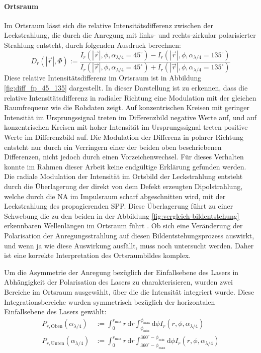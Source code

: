 \documentclass[titlepage,  ngerman]{article}
\begin{document}
		\paragraph{Ortsraum}
		Im Ortsraum lässt sich die relative Intensitätsdifferenz zwischen der Leckstrahlung, die durch die Anregung mit links- und rechts-zirkular polarisierter Strahlung entsteht, durch folgenden Ausdruck berechnen:
		\begin{equation}
		 	\label{eq:diff_measure}
			D_r\left(|\vec{r}|, \Phi\right) := \dfrac{I_r(|\vec{r}|, \phi, \alpha_{\lambda /4} = 45^\circ) - I_r(|\vec{r}|, \phi, \alpha_{\lambda /4} = 135^\circ)}{I_r(|\vec{r}|, \phi, \alpha_{\lambda /4} = 45^\circ) + I_r(|\vec{r}|, \phi, \alpha_{\lambda /4} = 135^\circ)}
		\end{equation} 
		 Diese relative Intensitätsdifferenz im Ortsraum ist in Abbildung \ref{fig:diff_fp_45_135} dargestellt. In dieser Darstellung ist zu erkennen, dass die relative Intensitätsdifferenz in radialer Richtung eine Modulation mit der gleichen Raumfrequenz wie die Rohdaten zeigt. Auf konzentrischen Kreisen mit geringer Intensität im Ursprungssignal treten im Differenzbild negative Werte auf, und auf konzentrischen Kreisen mit hoher Intensität im Ursprungssignal treten positive Werte im Differenzbild auf. Die Modulation der Differenz in polarer Richtung entsteht nur durch ein Verringern einer der beiden oben beschriebenen Differenzen, nicht jedoch durch einen Vorzeichenwechsel. Für dieses Verhalten konnte im Rahmen dieser Arbeit keine endgültige Erklärung gefunden werden. Die radiale Modulation der Intensität im Ortsbild der Leckstrahlung entsteht durch die Überlagerung der direkt von dem Defekt erzeugten Dipolstrahlung, welche durch die NA im Impulsraum scharf abgeschnitten wird, mit der Leckstrahlung des propagierenden SPP. Diese Überlagerung führt zu einer Schwebung die zu den beiden in der Abbildung \ref{fig:vergleich-bildentstehung} erkennbaren Wellenlängen im Ortsraum führt \cite{Hohenau.2011}. Ob sich eine Veränderung der Polarisation der Anregungsstrahlung auf diesen Bildentstehungsprozess auswirkt, und wenn ja wie diese Auswirkung ausfällt, muss noch untersucht werden. Daher ist eine korrekte Interpretation des Ortsraumbildes komplex. 
		 
		 Um die Asymmetrie der Anregung bezüglich der Einfallsebene des Lasers in Abhängigkeit der Polarisation des Lasers zu charakterisieren, wurden zwei Bereiche im Ortsraum ausgewählt, über die die Intensität integriert wurde. Diese Integrationsbereiche wurden symmetrisch bezüglich der horizontalen Einfallsebene des Lasers gewählt:		 
		 \begin{align}
		 	P_{r, \mathrm{Oben}}(\alpha_{\lambda/4}) &:= \int_{0}^{r_\mathrm{max}}r \, \mathrm{d}r \int_{\phi_\mathrm{min}}^{\phi_\mathrm{max}} \mathrm{d}\phi I_r(r, \phi, \alpha_{\lambda /4}) \\
		 	\nonumber
		 	P_{r, \mathrm{Unten}}(\alpha_{\lambda/4}) &:= \int_{0}^{r_\mathrm{max}}r \, \mathrm{d}r \int_{360^\circ -\phi_\mathrm{max}}^{360^\circ - \phi_\mathrm{min}} \mathrm{d}\phi I_r(r, \phi, \alpha_{\lambda/4})		 	
		 \end{align}
	 
\end{document}
